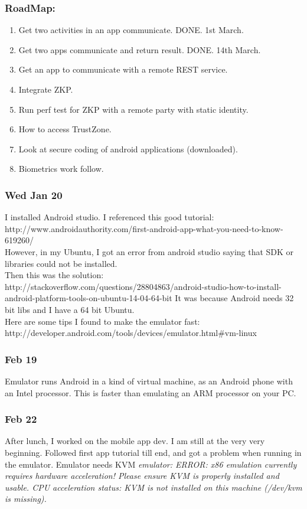 \documentclass[11pt]{article}
\begin{document}
\subsubsection*{RoadMap:}
\begin{enumerate}
 \item Get two activities in an app communicate. DONE. 1st March.
 \item Get two apps communicate and return result. DONE. 14th March.
 \item Get an app to communicate with a remote REST service.
 \item Integrate ZKP.
 \item Run perf test for ZKP with a remote party with static identity.
 \item How to access TrustZone.
 \item Look at secure coding of android applications (downloaded).
 \item Biometrics work follow.
\end{enumerate}



\subsubsection*{Wed Jan 20}
I installed Android studio. I referenced this good tutorial: http://www.androidauthority.com/first-android-app-what-you-need-to-know-619260/\\
However, in my Ubuntu, I got an error from android studio saying that SDK or libraries could not be installed. \\
Then this was the solution: http://stackoverflow.com/questions/28804863/android-studio-how-to-install-android-platform-tools-on-ubuntu-14-04-64-bit
It was because Android needs 32 bit libs and I have a 64 bit Ubuntu.\\
Here are some tips I found to make the emulator fast:
http://developer.android.com/tools/devices/emulator.html\#vm-linux

\subsubsection*{Feb 19}
Emulator runs Android in a kind of virtual machine, as an Android phone with an Intel processor. This is faster than emulating an ARM processor on 
your PC.

\subsubsection*{Feb 22}
After lunch, I worked on the mobile app dev. I am still at the very very beginning. Followed first app tutorial till end, and got a problem when 
running in the emulator. Emulator needs KVM \textit{emulator: ERROR: x86 emulation currently requires hardware acceleration!
Please ensure KVM is properly installed and usable.
CPU acceleration status: KVM is not installed on this machine (/dev/kvm is missing).} \\
\end{document}
